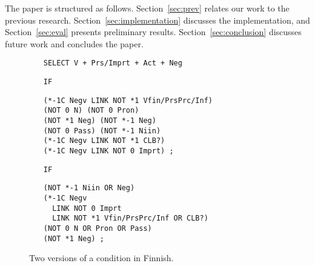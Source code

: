 The paper is structured as follows. Section~\ref{sec:prev} relates our
work to the previous research. 
Section~\ref{sec:implementation} discusses the implementation, and
Section~\ref{sec:eval} presents preliminary results. 
Section~\ref{sec:conclusion} discusses future work and concludes the paper.


\begin{figure}[t]
\centering
\begin{itemize}

\item[]\texttt{SELECT V + Prs/Imprt + Act + Neg}

\item[\texttt{IF}]
\begin{verbatim}(*-1C Negv LINK NOT *1 Vfin/PrsPrc/Inf) 
(NOT 0 N) (NOT 0 Pron) 
(NOT *1 Neg) (NOT *-1 Neg)
(NOT 0 Pass) (NOT *-1 Niin) 
(*-1C Negv LINK NOT *1 CLB?) 
(*-1C Negv LINK NOT 0 Imprt) ; 
\end{verbatim}

\item[\texttt{IF}]
\begin{verbatim}(NOT *-1 Niin OR Neg)  
(*-1C Negv
  LINK NOT 0 Imprt
  LINK NOT *1 Vfin/PrsPrc/Inf OR CLB?) 
(NOT 0 N OR Pron OR Pass) 
(NOT *1 Neg) ;
\end{verbatim}
\end{itemize}

\caption{Two versions of a condition in Finnish.}

\label{fig:regroup}
\end{figure}






